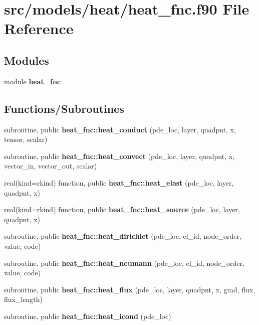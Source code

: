 \section{src/models/heat/heat\+\_\+fnc.f90 File Reference}
\label{heat__fnc_8f90}
\subsection*{Modules}
\begin{DoxyCompactItemize}
\item 
module {\bf heat\+\_\+fnc}
\end{DoxyCompactItemize}
\subsection*{Functions/\+Subroutines}
\begin{DoxyCompactItemize}
\item 
subroutine, public {\bf heat\+\_\+fnc\+::heat\+\_\+conduct} (pde\+\_\+loc, layer, quadpnt, x, tensor, scalar)
\item 
subroutine, public {\bf heat\+\_\+fnc\+::heat\+\_\+convect} (pde\+\_\+loc, layer, quadpnt, x, vector\+\_\+in, vector\+\_\+out, scalar)
\item 
real(kind=rkind) function, public {\bf heat\+\_\+fnc\+::heat\+\_\+elast} (pde\+\_\+loc, layer, quadpnt, x)
\item 
real(kind=rkind) function, public {\bf heat\+\_\+fnc\+::heat\+\_\+source} (pde\+\_\+loc, layer, quadpnt, x)
\item 
subroutine, public {\bf heat\+\_\+fnc\+::heat\+\_\+dirichlet} (pde\+\_\+loc, el\+\_\+id, node\+\_\+order, value, code)
\item 
subroutine, public {\bf heat\+\_\+fnc\+::heat\+\_\+neumann} (pde\+\_\+loc, el\+\_\+id, node\+\_\+order, value, code)
\item 
subroutine, public {\bf heat\+\_\+fnc\+::heat\+\_\+flux} (pde\+\_\+loc, layer, quadpnt, x, grad, flux, flux\+\_\+length)
\item 
subroutine, public {\bf heat\+\_\+fnc\+::heat\+\_\+icond} (pde\+\_\+loc)
\end{DoxyCompactItemize}

